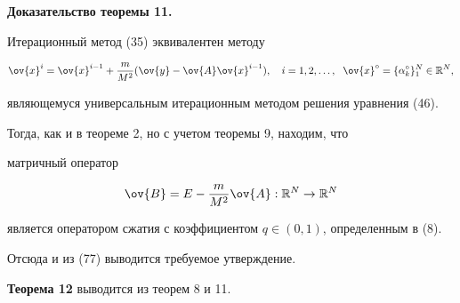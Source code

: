 {\bf Доказательство теоремы 11.}


Итерационный метод (35) эквивалентен методу


\begin{equation}


\ov{x}^i=\ov{x}^{i-1}+\frac{m}{M^2}(\ov{y}-\ov{A}\ov{x}^{i-1}),


\quad i=1,2,\dotsc,\ \; \ov{x}^\circ =\{\alpha_k^\circ \}_1^N


\in \Bbb R^N,


\end{equation}


являющемуся универсальным итерационным методом решения уравнения (46).


Тогда, как и в теореме 2, но с учетом теоремы 9, находим, что


матричный оператор


$$


\operator{\ov{B}=E-\frac{m}{M^2}\ov{A}}{\Bbb R^N}{\Bbb R^N}


$$


является оператором сжатия с коэффициентом $q\in (0,1)$, определенным в (8).


Отсюда и из (77) выводится требуемое утверждение.


\medskip





{\bf Теорема 12} выводится из теорем 8 и 11.





